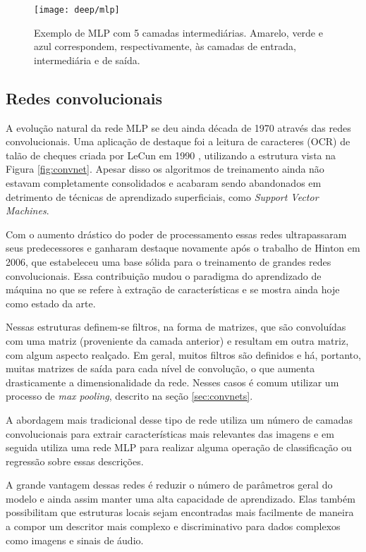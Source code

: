 \begin{figure}
\centering
\texttt{[image: deep/mlp]}
\caption{Exemplo de MLP com 5 camadas intermediárias. Amarelo, verde e azul correspondem, respectivamente, às camadas de entrada, intermediária e de saída.}
\label{fig:mlp}
\end{figure}

\subsection{Redes convolucionais}
A evolução natural da rede MLP se deu ainda década de 1970 através das redes convolucionais. Uma aplicação de destaque foi a leitura de caracteres (OCR) de talão de cheques criada por LeCun em 1990 \cite{lecunhandwritten}, utilizando a estrutura vista na Figura \ref{fig:convnet}. Apesar disso os algoritmos de treinamento ainda não estavam completamente consolidados e acabaram sendo abandonados em detrimento de técnicas de aprendizado superficiais, como \textit{Support Vector Machines}.

Com o aumento drástico do poder de processamento essas redes ultrapassaram seus predecessores e ganharam destaque novamente após o trabalho de Hinton \cite{hintonCONVNET} em 2006, que estabeleceu uma base sólida para o treinamento de grandes redes convolucionais. Essa contribuição mudou o paradigma do aprendizado de máquina no que se refere à extração de características e se mostra ainda hoje como estado da arte. 

Nessas estruturas definem-se filtros, na forma de matrizes, que são convoluídas com uma matriz (proveniente da camada anterior) e resultam em outra matriz, com algum aspecto realçado. Em geral, muitos filtros são definidos e há, portanto, muitas matrizes de saída para cada nível de convolução, o que aumenta drasticamente a dimensionalidade da rede. Nesses casos é comum utilizar um processo de \textit{max pooling}, descrito na seção \ref{sec:convnets}.

A abordagem mais tradicional desse tipo de rede utiliza um número de camadas convolucionais para extrair características mais relevantes das imagens e em seguida utiliza uma rede MLP para realizar alguma operação de classificação ou regressão sobre essas descrições.

A grande vantagem dessas redes é reduzir o número de parâmetros geral do modelo e ainda assim manter uma alta capacidade de aprendizado. Elas também possibilitam que estruturas locais sejam encontradas mais facilmente de maneira a compor um descritor mais complexo e discriminativo para dados complexos como imagens e sinais de áudio.

